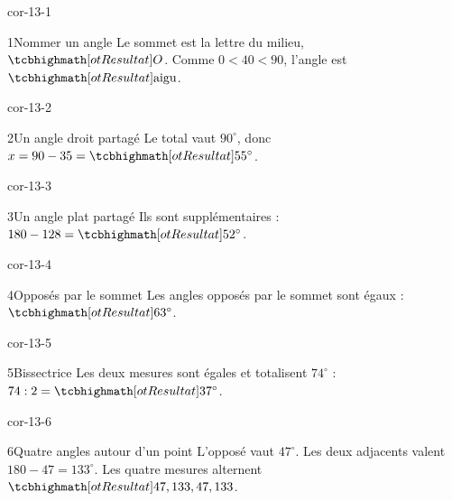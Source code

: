 \clearpage\pagestyle{otMain}\setlength{\otBlocEspacement}{2.5mm}\fontsize{11}{15}\selectfont{}
\begin{blocLivre}{cor-13-1}\begin{corrige}{1}{Nommer un angle}
Le sommet est la lettre du milieu, $\res O$. Comme $0<40<90$, l’angle est $\res{\text{aigu}}$.
\label{fig-cor-13-1}
\end{corrige}\end{blocLivre}
\begin{blocLivre}{cor-13-2}\begin{corrige}{2}{Un angle droit partagé}
Le total vaut $90^\circ$, donc $x=90-35=\res{55^\circ}$.
\label{fig-cor-13-2}
\end{corrige}\end{blocLivre}
\begin{blocLivre}{cor-13-3}\begin{corrige}{3}{Un angle plat partagé}
Ils sont supplémentaires : $180-128=\res{52^\circ}$.
\label{fig-cor-13-3}
\end{corrige}\end{blocLivre}
\begin{blocLivre}{cor-13-4}\begin{corrige}{4}{Opposés par le sommet}
Les angles opposés par le sommet sont égaux : $\res{63^\circ}$.
\label{fig-cor-13-4}
\end{corrige}\end{blocLivre}
\begin{blocLivre}{cor-13-5}\begin{corrige}{5}{Bissectrice}
Les deux mesures sont égales et totalisent $74^\circ$ : $74:2=\res{37^\circ}$.
\label{fig-cor-13-5}
\end{corrige}\end{blocLivre}
\begin{blocLivre}{cor-13-6}\begin{corrige}{6}{Quatre angles autour d’un point}
L’opposé vaut $47^\circ$. Les deux adjacents valent $180-47=133^\circ$. Les quatre mesures alternent $\res{47,133,47,133}$.
\label{fig-cor-13-6}
\end{corrige}\end{blocLivre}

